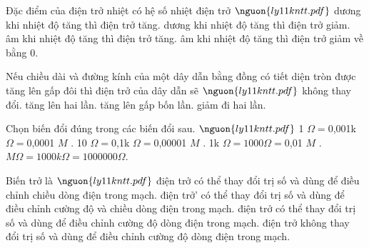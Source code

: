 \begin{ex}
Đặc điểm của điện trở nhiệt có hệ số nhiệt điện trở $\nguon{ly11 kntt.pdf}$
\choice
{\True dương khi nhiệt độ tăng thì điện trở tăng.}
{dương khi nhiệt độ tăng thì điện trở giảm.}
{âm khi nhiệt độ tăng thì điện trở tăng.}
{âm khi nhiệt độ tăng thì điện trở giảm về bằng 0.}
\end{ex}

\begin{ex}
Nếu chiều dài và đường kính của một dây dẫn bằng đồng có tiết diện tròn được tăng lên gấp đôi thì điện trở của dây dẫn sẽ $\nguon{ly11 kntt.pdf}$
\choice
{không thay đổi.}
{tăng lên hai lần.}
{tăng lên gấp bốn lần.}
{\True giảm đi hai lần.}
\end{ex}

\begin{ex}
Chọn biến đổi đúng trong các biến đổi sau. $\nguon{ly11 kntt.pdf}$
\choice
{1 $\Omega = 0$,001k $\Omega = 0$,0001 $M$ \Omega.}
{10 $\Omega = 0$,1k $\Omega = 0$,00001 $M$ \Omega.}
{1k $\Omega = 1000\Omega = 0$,01 $M$ \Omega.}
{ $M\Omega = 1000k\Omega = 1000000\Omega.$}
\end{ex}

\begin{ex}
Biến trở là $\nguon{ly11 kntt.pdf}$
\choice
{điện trở có thể thay đổi trị số và dùng để điều chỉnh chiều dòng điện trong mạch.}
{điện trở' có thể thay đổi trị số và dùng để điều chỉnh cường độ và chiều dòng điện trong mạch.}
{\True điện trở có thể thay đổi trị số và dùng để điều chỉnh cường độ dòng điện trong mạch.}
{điện trở không thay đổi trị số và dùng để điều chỉnh cường độ dòng điện trong mạch.}
\end{ex}

